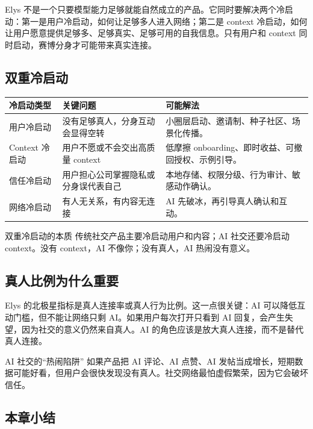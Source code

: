 \documentclass[a4paper]{article}
\begin{document}
Elys 不是一个只要模型能力足够就能自然成立的产品。它同时要解决两个冷启动：第一是用户冷启动，如何让足够多人进入网络；第二是 context 冷启动，如何让用户愿意提供足够多、足够真实、足够可用的自我信息。只有用户和 context 同时启动，赛博分身才可能带来真实连接。

\subsection{双重冷启动}

\noindent\begin{longtable}{p{}p{}p{}}
\toprule
冷启动类型 & 关键问题 & 可能解法 \\
\midrule
用户冷启动 & 没有足够真人，分身互动会显得空转 & 小圈层启动、邀请制、种子社区、场景化传播。 \\
Context 冷启动 & 用户不愿或不会交出高质量 context & 低摩擦 onboarding、即时收益、可撤回授权、示例引导。 \\
信任冷启动 & 用户担心公司掌握隐私或分身误代表自己 & 本地存储、权限分级、行为审计、敏感动作确认。 \\
网络冷启动 & 有人无关系，有内容无连接 & AI 先破冰，再引导真人确认和互动。 \\
\bottomrule
\end{longtable}

\begin{importantbox}{双重冷启动的本质}
传统社交产品主要冷启动用户和内容；AI 社交还要冷启动 context。没有 context，AI 不像你；没有真人，AI 热闹没有意义。
\end{importantbox}

\subsection{真人比例为什么重要}

Elys 的北极星指标是真人连接率或真人行为比例。这一点很关键：AI 可以降低互动门槛，但不能让网络只剩 AI。如果用户每次打开只看到 AI 回复，会产生失望，因为社交的意义仍然来自真人。AI 的角色应该是放大真人连接，而不是替代真人连接。

\begin{warningbox}{AI 社交的“热闹陷阱”}
如果产品把 AI 评论、AI 点赞、AI 发帖当成增长，短期数据可能好看，但用户会很快发现没有真人。社交网络最怕虚假繁荣，因为它会破坏信任。
\end{warningbox}

\subsection{本章小结}
\end{document}
